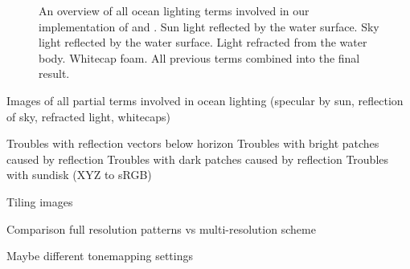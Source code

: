 \begin{figure}
{	\label{fig:results:complete}
 }
\caption{An overview of all ocean lighting terms involved in our implementation
of \citet{article:oceanlighting,misc:oceanlightingfft} and \citet{article:whitecaps}.
 Sun light reflected by the water surface.
 Sky light reflected by the water surface.
 Light refracted from the water body.
 Whitecap foam.
 All previous terms combined into the final
result.
}
\label{fig:results}
\end{figure}
%
Images of all partial terms involved in ocean lighting (specular by sun,
reflection of sky, refracted light, whitecaps)

Troubles with reflection vectors below horizon
Troubles with bright patches caused by reflection
Troubles with dark patches caused by reflection
Troubles with sundisk (XYZ to sRGB)

Tiling images

Comparison full resolution patterns vs multi-resolution scheme

Maybe different tonemapping settings